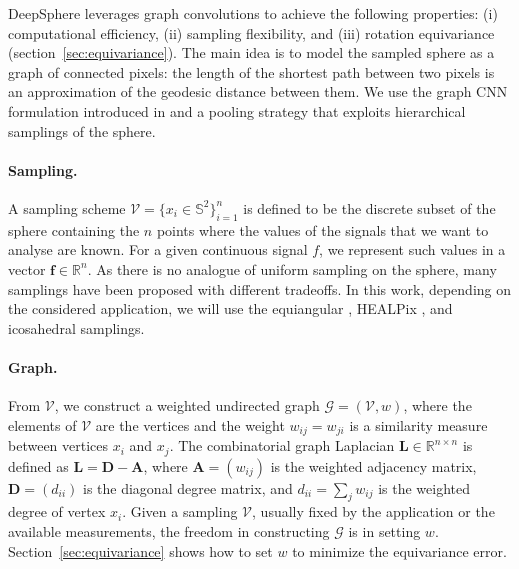 \documentclass{article} %
\renewcommand{\b}[1]{{\bm{#1}}}  %
\newcommand{\R}{\mathbb{R}}
\renewcommand{\S}{\mathbb{S}}
\newcommand{\G}{\mathcal{G}}  %
\newcommand{\V}{\mathcal{V}}  %
\DeclareMathOperator*{\diag}{diag}
\newcommand{\figref}[1]{figure~\ref{fig:#1}}
\newcommand{\secref}[1]{section~\ref{sec:#1}}
\newcommand{\Secref}[1]{Section~\ref{sec:#1}}
\begin{document}
DeepSphere leverages graph convolutions to achieve the following properties: (i) computational efficiency, (ii) sampling flexibility, and (iii) rotation equivariance (\secref{equivariance}).
The main idea is to model the sampled sphere as a graph of connected pixels: the length of the shortest path between two pixels is an approximation of the geodesic distance between them.
We use the graph CNN formulation introduced in \citep{defferrard2016graphnn} and a pooling strategy that exploits hierarchical samplings of the sphere.

\paragraph{Sampling.}
A sampling scheme $\V = \{x_i \in \S^2\}_{i=1}^n$ is defined to be the discrete subset of the sphere containing the $n$ points where the values of the signals that we want to analyse are known. For a given continuous signal $f$, we represent such values in a vector $\b{f}\in\mathbb R^n$. As there is no analogue of uniform sampling on the sphere, many samplings have been proposed with different tradeoffs.
In this work, depending on the considered application, we will use the equiangular \citep{driscoll1994Fouriersphere}, HEALPix \citep{gorski2005healpix}, and icosahedral \citep{baumgardner1985icosahedral} samplings.

\paragraph{Graph.}
From $\V$, we construct a weighted undirected graph $\G = (\V, w)$, where the elements of $\V$ are the vertices and the weight $w_{ij} = w_{ji}$ is a similarity measure between vertices $x_i$ and $x_j$.
The combinatorial graph Laplacian $\b{L} \in \R^{n \times n}$ is defined as $\b{L} = \b{D} - \b{A}$, where $\b{A} = (w_{ij})$ is the weighted adjacency matrix, $\b{D} = (d_{ii})$ is the diagonal degree matrix, and $d_{ii} = \sum_j w_{ij}$ is the weighted degree of vertex $x_i$.
Given a sampling $\V$, usually fixed by the application or the available measurements, the freedom in constructing $\G$ is in setting $w$.
\Secref{equivariance} shows how to set $w$ to minimize the equivariance error.
\end{document}
